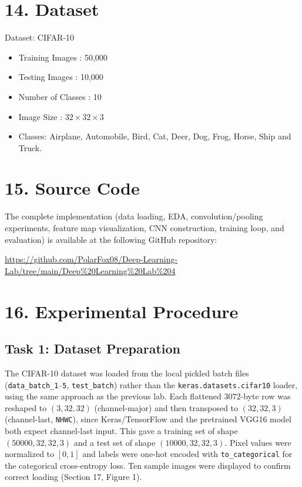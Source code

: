 \documentclass[11pt]{article}
\begin{document}

\section*{14. Dataset}

Dataset: CIFAR-10

\begin{itemize}

\item Training Images : 50,000

\item Testing Images : 10,000

\item Number of Classes : 10

\item Image Size : $32\times32\times3$

\item Classes:
Airplane, Automobile, Bird, Cat, Deer,
Dog, Frog, Horse, Ship and Truck.

\end{itemize}

\section*{15. Source Code}
The complete implementation (data loading, EDA, convolution/pooling experiments, feature map visualization, CNN construction, training loop, and evaluation) is available at the following GitHub repository:

\begin{center}
\url{https://github.com/PolarFox08/Deep-Learning-Lab/tree/main/Deep%20Learning%20Lab%204}
\end{center}

\section*{16. Experimental Procedure}

\subsection*{Task 1: Dataset Preparation}

The CIFAR-10 dataset was loaded from the local pickled batch files
(\texttt{data\_batch\_1}--\texttt{5}, \texttt{test\_batch}) rather than the
\texttt{keras.datasets.cifar10} loader, using the same approach as the
previous lab. Each flattened $3072$-byte row was reshaped to
$(3,32,32)$ (channel-major) and then transposed to $(32,32,3)$
(channel-last, \texttt{NHWC}), since Keras/TensorFlow and the pretrained
VGG16 model both expect channel-last input. This gave a training set of
shape $(50000,32,32,3)$ and a test set of shape $(10000,32,32,3)$. Pixel
values were normalized to $[0,1]$ and labels were one-hot encoded with
\texttt{to\_categorical} for the categorical cross-entropy loss. Ten
sample images were displayed to confirm correct loading (Section 17,
Figure 1).
\end{document}
